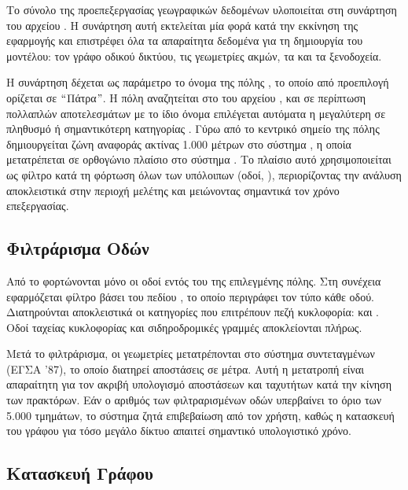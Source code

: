 Το σύνολο της προεπεξεργασίας γεωγραφικών δεδομένων υλοποιείται
στη συνάρτηση  του αρχείου .
Η συνάρτηση αυτή εκτελείται μία φορά κατά την εκκίνηση της
εφαρμογής και επιστρέφει όλα τα απαραίτητα δεδομένα για τη
δημιουργία του μοντέλου: τον γράφο οδικού δικτύου, τις
γεωμετρίες ακμών, τα  και τα ξενοδοχεία.

Η συνάρτηση δέχεται ως παράμετρο το όνομα της πόλης
, το οποίο από προεπιλογή ορίζεται σε
$``$Πάτρα$"$. Η πόλη αναζητείται στο
 του αρχείου ,
και σε περίπτωση πολλαπλών αποτελεσμάτων με το ίδιο όνομα
επιλέγεται αυτόματα η μεγαλύτερη σε πληθυσμό ή σημαντικότερη
κατηγορίας . Γύρω από το κεντρικό
σημείο της πόλης δημιουργείται ζώνη αναφοράς 
ακτίνας 1.000 μέτρων στο σύστημα , η οποία
μετατρέπεται σε ορθογώνιο πλαίσιο  στο σύστημα
. Το πλαίσιο αυτό χρησιμοποιείται ως φίλτρο κατά τη
φόρτωση όλων των υπόλοιπων  (οδοί, ),
περιορίζοντας την ανάλυση αποκλειστικά στην περιοχή μελέτης και
μειώνοντας σημαντικά τον χρόνο επεξεργασίας.

\subsection{Φιλτράρισμα Οδών}

Από το  φορτώνονται μόνο οι
οδοί εντός του  της επιλεγμένης πόλης. Στη
συνέχεια εφαρμόζεται φίλτρο βάσει του πεδίου , το
οποίο περιγράφει τον τύπο κάθε οδού. Διατηρούνται αποκλειστικά
οι κατηγορίες που επιτρέπουν πεζή κυκλοφορία:  και . Οδοί ταχείας
κυκλοφορίας  και σιδηροδρομικές γραμμές
αποκλείονται πλήρως.

Μετά το φιλτράρισμα, οι γεωμετρίες μετατρέπονται στο σύστημα
συντεταγμένων  (ΕΓΣΑ '87), το οποίο διατηρεί
αποστάσεις σε μέτρα. Αυτή η μετατροπή είναι απαραίτητη για τον
ακριβή υπολογισμό αποστάσεων και ταχυτήτων κατά την κίνηση των
πρακτόρων. Εάν ο αριθμός των φιλτραρισμένων οδών υπερβαίνει το
όριο των 5.000 τμημάτων, το σύστημα ζητά επιβεβαίωση από τον
χρήστη, καθώς η κατασκευή του γράφου για τόσο μεγάλο δίκτυο
απαιτεί σημαντικό υπολογιστικό χρόνο.

\subsection{Κατασκευή Γράφου}

